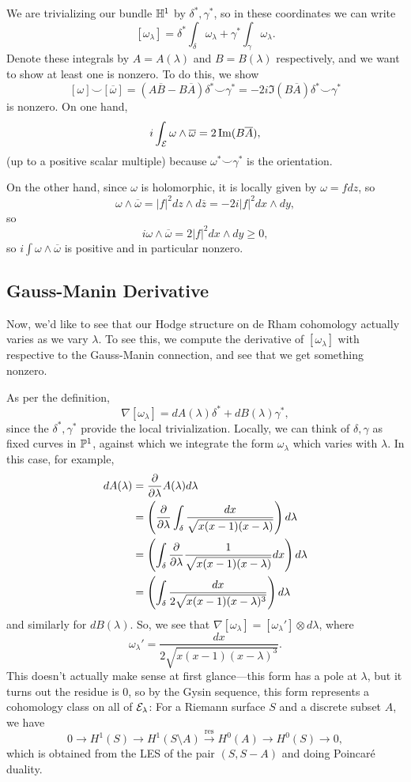 \documentclass[12pt]{article}
\begin{document}
We are trivializing our bundle $\bH^1$ by $\delta^*,\gamma^*$, so in these coordinates we can write
\[[\omega_\lambda] = \delta^*\int_\delta \omega_\lambda + \gamma^* \int_\gamma \omega_\lambda.\]
Denote these integrals by $A=A(\lambda)$ and $B=B(\lambda)$ respectively, and we want to show at least one is nonzero. To do this, we show
\[[\omega]\smile [\overline{\omega}] = (A\overline{B}-B\overline{A})\delta^* \smile \gamma^* = -2i\Im(B\overline{A})\delta^* \smile \gamma^*\]
is nonzero. On one hand,
\[i\int_{\cE} \omega \wedge \overline{\omega} = 2\Im(B\overline{A}),\]
(up to a positive scalar multiple) because $\omega^*\smile \gamma^*$ is the orientation.

On the other hand, since $\omega$ is holomorphic, it is locally given by $\omega=fdz$, so
\[\omega \wedge \overline{\omega} = |f|^2 dz\wedge d\overline{z} = -2i|f|^2 dx\wedge dy,\]
so
\[i\omega\wedge \overline{\omega} = 2|f|^2 dx\wedge dy \geq 0,\]
so $i\int\omega\wedge\overline{\omega}$ is positive and in particular nonzero.

\subsection{Gauss-Manin Derivative}

Now, we'd like to see that our Hodge structure on de Rham cohomology actually varies as we vary $\lambda$. To see this, we compute the derivative of $[\omega_\lambda]$ with respective to the Gauss-Manin connection, and see that we get something nonzero.

As per the definition,
\[\nabla [\omega_\lambda] = dA(\lambda) \delta^* + dB(\lambda) \gamma^*,\]
since the $\delta^*,\gamma^*$ provide the local trivialization. Locally, we can think of $\delta,\gamma$ as fixed curves in $\P^1$, against which we integrate the form $\omega_\lambda$ which varies with $\lambda$. In this case, for example,
\begin{align*}
    dA(\lambda) &= \frac{\partial}{\partial\lambda} A(\lambda) d\lambda\\
    &= \left(\pdv{}{\lambda} \int_{\delta} \frac{dx}{\sqrt{x(x-1)(x-\lambda)}}\right) d\lambda\\
    &= \left(\int_\delta \pdv{}{\lambda} \frac{1}{\sqrt{x(x-1)(x-\lambda)}} dx\right) d\lambda\\
    &= \left(\int_\delta \frac{dx}{2\sqrt{x(x-1)(x-\lambda)^3}} \right) d\lambda
\end{align*}
and similarly for $dB(\lambda)$. So, we see that $\nabla [\omega_\lambda] = [\omega_\lambda'] \otimes d\lambda$, where
\[\omega_\lambda' = \frac{dx}{2\sqrt{x(x-1)(x-\lambda)^3}}.\]
This doesn't actually make sense at first glance---this form has a pole at $\lambda$, but it turns out the residue is 0, so by the Gysin sequence, this form represents a cohomology class on all of $\cE_\lambda$: For a Riemann surface $S$ and a discrete subset $A$, we have
\[0 \to H^1(S) \to H^1(S\setminus A) \xrightarrow{\mathrm{res}} H^0(A) \to H^0(S) \to 0,\]
which is obtained from the LES of the pair $(S,S-A)$ and doing Poincar\'e duality.
\end{document}
